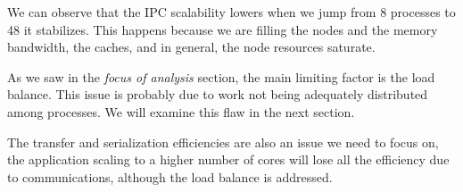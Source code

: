 We can observe that the IPC scalability lowers when we jump from 8 processes to 48 it stabilizes. This happens because we are filling the nodes and the memory bandwidth, the caches, and in general, the node resources saturate. 

As we saw in the \textit{focus of analysis} section, the main limiting factor is the load balance. This issue is probably due to work not being adequately distributed among processes. We will examine this flaw in the next section.

The transfer and serialization efficiencies are also an issue we need to focus on, the application scaling to a higher number of cores will lose all the efficiency due to communications, although the load balance is addressed.
